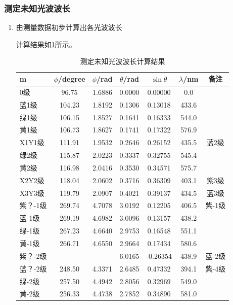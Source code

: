 \documentclass[dvipsnames, svgnames,a4paper,11pt]{article}
\begin{document}
	\subsubsection{测定未知光波波长}
	\begin{enumerate}
		\item 由测量数据初步计算出各光波波长
		
		计算结果如\cref{tab:tab4}所示。
		\begin{table}[htbp]
			\centering
			\caption{测定未知光波波长计算结果}
			\begin{tabular}{|l|c|c|c|c|c|c|}
				\hline
				m & $\phi$/degree & $\phi$/rad & $\theta$/rad & $\sin{\theta}$ & $\lambda$/nm & 备注 \\
				\hline
				0级 & 96.75 & 1.6886 & 0.0000 & 0.00000 & 0.0 & \\
				蓝1级 & 104.23 & 1.8192 & 0.1306 & 0.13018 & 433.6 & \\
				绿1级 & 106.15 & 1.8527 & 0.1641 & 0.16333 & 544.0 & \\
				黄1级 & 106.73 & 1.8627 & 0.1741 & 0.17322 & 576.9 & \\
				X1Y1级 & 111.91 & 1.9532 & 0.2646 & 0.26152 & 435.5 & 蓝2级 \\
				绿2级 & 115.87 & 2.0223 & 0.3337 & 0.32755 & 545.4 & \\
				黄2级 & 116.98 & 2.0416 & 0.3530 & 0.34571 & 575.7 & \\
				X2Y2级 & 118.04 & 2.0602 & 0.3716 & 0.36309 & 403.1 & 紫3级 \\
				X3Y3级 & 119.79 & 2.0907 & 0.4021 & 0.39137 & 434.5 & 蓝3级 \\
				紫？-1级 & 269.74 & 4.7078 & 3.0192 & 0.12205 & 406.5 & 紫-1级 \\
				蓝-1级 & 269.19 & 4.6982 & 3.0096 & 0.13157 & 438.2 & \\
				绿-1级 & 267.23 & 4.6640 & 2.9753 & 0.16548 & 551.1 & \\
				黄-1级 & 266.71 & 4.6550 & 2.9664 & 0.17434 & 580.6 & \\
				紫？-2级 & & & 6.0165 & -0.26354 & 438.9 & 蓝-2级 \\
				蓝？-2级 & 248.50 & 4.3371 & 2.6485 & 0.47332 & 394.1 & 紫-4级 \\
				绿-2级 & 257.50 & 4.4942 & 2.8056 & 0.32969 & 549.0 & \\
				黄-2级 & 256.33 & 4.4738 & 2.7852 & 0.34890 & 581.0 & \\
				\hline
			\end{tabular}
			\label{tab:tab4}
		\end{table}
		

\end{enumerate}
\end{document}
